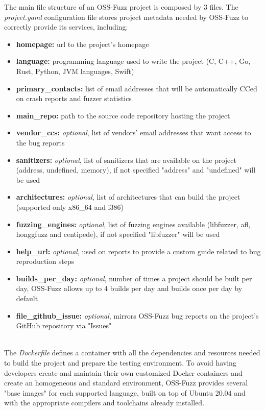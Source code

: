 \documentclass[Lau,oneside]{sapthesis}%
\begin{document}
\newpage
The main file structure of an OSS-Fuzz project is composed by 3 files.
\newline \newline
The \textit{project.yaml} configuration file stores project metadata needed by OSS-Fuzz to correctly provide its services, including:
\begin{itemize}
    \item \textbf{homepage:} url to the project's homepage
    \item \textbf{language:} programming language used to write the project (C, C++, Go, Rust, Python, JVM languages, Swift)
    \item \textbf{primary\_contacts:} list of email addresses that will be automatically CCed on crash reports and fuzzer statistics
    \item \textbf{main\_repo:} path to the source code repository hosting the project
    \item \textbf{vendor\_ccs:} \textit{optional}, list of vendors' email addresses that want access to the bug reports
    \item \textbf{sanitizers:} \textit{optional}, list of sanitizers that are available on the project (address, undefined, memory), if not specified "address" and "undefined" will be used
    \item \textbf{architectures:} \textit{optional}, list of architectures that can build the project (supported only x86\_64 and i386)
    \item \textbf{fuzzing\_engines:} \textit{optional}, list of fuzzing engines available (libfuzzer, afl, honggfuzz and centipede), if not specified "libfuzzer" will be used
    \item \textbf{help\_url:} \textit{optional}, used on reports to provide a custom guide related to bug reproduction steps
    \item \textbf{builds\_per\_day:} \textit{optional}, number of times a project should be built per day, OSS-Fuzz allows up to 4 builds per day and builds once per day by default
    \item \textbf{file\_github\_issue:} \textit{optional}, mirrors OSS-Fuzz bug reports on the project's GitHub repository via "Issues"
\end{itemize}
\ \\
The \textit{Dockerfile} defines a container with all the dependencies and resources needed to build the project and prepare the testing environment.
\newline
To avoid having developers create and maintain their own customized Docker containers and create an homogeneous and standard environment, OSS-Fuzz provides several "base images" for each supported language, built on top of Ubuntu 20.04 and with the appropriate compilers and toolchains already installed.
\end{document}
